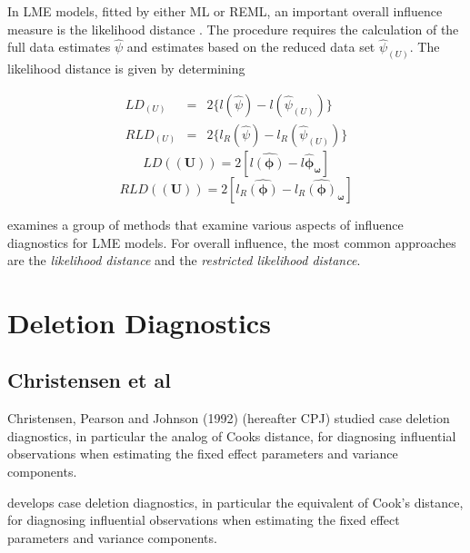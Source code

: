 \documentclass[12pt, a4paper]{report}
\theoremstyle{plain}
\theoremstyle{definition}
\theoremstyle{remark}
\begin{document}
In LME models, fitted by either ML or REML, an important overall
influence measure is the likelihood distance \citep{cook82}. The  procedure requires the calculation of the full data estimates
$\hat{\psi}$ and estimates based on the reduced data set  $\hat{\psi}_{(U)}$. The likelihood distance is given by
determining


\begin{eqnarray}
LD_{(U)} &=& 2\{l(\hat{\psi}) - l( \hat{\psi}_{(U)}) \}\\
RLD_{(U)} &=& 2\{l_{R}(\hat{\psi}) - l_{R}(\hat{\psi}_{(U)})\}
\end{eqnarray}
\[  LD(\boldsymbol{(U)})= 2[l\boldsymbol{\hat{(\phi)}} - l\boldsymbol{\hat{\phi}_\omega} ] \]
\[  RLD(\boldsymbol{(U)})= 2[ l_R\boldsymbol{\hat{(\phi)}} - l_R\boldsymbol{\hat{(\phi)}_\omega} ] \]

\citet{west} examines a group of methods that examine various aspects of influence diagnostics for LME models.
For overall influence, the most common approaches are the \textit{likelihood distance} and the \textit{restricted likelihood distance}.






\chapter{Deletion Diagnostics}

\section{Christensen et al}         %
Christensen, Pearson and Johnson (1992) (hereafter CPJ) studied case deletion diagnostics, in particular the analog of Cooks
distance, for diagnosing influential observations when estimating
the fixed effect parameters and variance
components.

\citet{Christensen} develops  case deletion diagnostics, in particular the equivalent of  Cook's distance, for diagnosing influential observations when estimating the fixed effect parameters and variance components.
\end{document}
